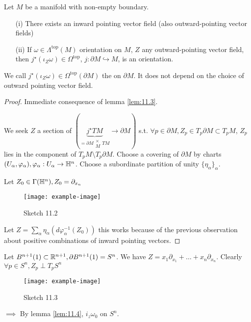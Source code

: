 \begin{lemma}\label{lem:11.4}
    Let \(M\) be a manifold with non-empty boundary.
    \begin{enumerate}
        \item[(i)] There exists an inward pointing vector field (also outward-pointing vector fields)
        \item[(ii)] If \(\omega\in\Lambda^{\text{top}}(M)\) orientation on \(M\), \(Z\) any outward-pointing vector field, then 
                    \(j^\star(\iota_Z\omega)\in \Omega^{\text{top}}\), \(j:\partial M\hookrightarrow M\), is an orientation. 
    \end{enumerate}
    We call \(j^\star(\iota_Z\omega)\in\Omega^{\text{top}}(\partial M)\) the  on \(\partial M\). It does not depend on the choice of outward pointing vector field.
\end{lemma}


\begin{proof}
     Immediate consequence of lemma \ref{lem:11.3}.

     We seek \(Z\) a section of \((\underbrace{j^\star TM}_{=\partial M\substack{\times\\M} TM}\to \partial M)\)
    s.t. \(\forall p\in \partial M, Z_p\in T_p\partial M\subset T_p M\), \(Z_p\) lies in the  component of 
    \(T_p M \setminus T_p \partial M\). Choose a covering of \(\partial M\) by charts \((U_\alpha,\varphi_\alpha),\varphi_\alpha:U_\alpha\to\mathbb{H}^n\).
    Choose a subordinate partition of unity \(\{\eta_\alpha\}_{\alpha}\).

    Let \(Z_0\in\Gamma(\mathbb{H}^n),Z_0=\partial_{x_n}\)
    \begin{figure}[H]\label{fig:11.2}
        \centering
        \texttt{[image: example-image]}
        \caption{Sketch 11.2}
    \end{figure}
    Let \(Z=\sum_{\alpha}\eta_\alpha(d\varphi_{\alpha}^{-1}(Z_0))\) this works 
    because of the previous observation about positive combinations of inward pointing vectors.    
\end{proof}

\begin{example}
    Let \(B^{n+1}(1)\subset \mathbb{R}^{n+1},\partial B^{n+1}(1)=S^n\).
    We have \(Z=x_1\partial_{x_1}+\dots+x_n\partial_{x_n}\). Clearly \(\forall p\in S^n, Z_p\perp T_p S^n\)
    \begin{figure}[H]\label{fig:11.3}
        \centering
        \texttt{[image: example-image]}
        \caption{Sketch 11.3}
    \end{figure}
    \(\implies\) By lemma \ref{lem:11.4}, \(i_z \omega_0\) on \(S^n\).
\end{example}

